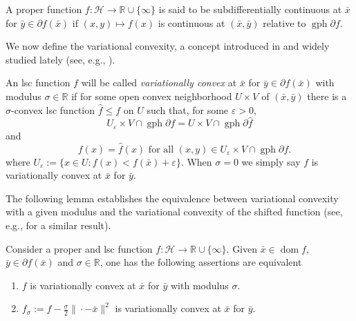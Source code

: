 \documentclass[smallextended,envcountsect,envcountsame]{svjour3}
\renewcommand{\H}{\mathcal{H}}
\newcommand{\R}{\mathbb{R}}
\newcommand{\gph}{\operatorname{gph}}
\newcommand{\dom}{\operatorname{dom}}
\renewcommand{\epsilon}{\varepsilon}
\newcommand{\1}{\mathds{1}}
\begin{document}
		\begin{definition}\label{subdif-cont}
			A proper function $f\colon \H\to\R\cup\{\infty\}$ is said to be subdifferentially continuous at $\bar x$ for $\bar y\in \partial f(\bar x)$ if $(x,y)\mapsto f(x)$ is continuous at $(\bar x,\bar y)$ relative to $\gph \partial f$.
		\end{definition}
	We now define the variational convexity, a concept introduced in \cite{MR3995335} and widely studied lately (see, e.g., \cite{MR4550949, Rockafellar2025-2, Rockafellar2025, MR4784083}).
	\begin{definition}
		An lsc function $f$ will be called \textit{variationally convex} at $\bar{x}$ for $\bar{y} \in \partial f(\bar{x})$ with modulus $\sigma\in\R$ if for some open convex neighborhood $U \times V$ of $(\bar{x}, \bar{y})$ there is a $\sigma$-convex lsc function $\hat{f} \leq f$ on $U$ such that, for some $\epsilon > 0$, 
		\begin{equation*}
			U_\varepsilon \times V \cap \operatorname{gph} \partial f = U \times V \cap \operatorname{gph} \partial \hat{f}
		\end{equation*}
		and
		\begin{equation*}
			\quad f(x) = \hat{f}(x) \text{ for all } (x,y)\in U_\varepsilon \times V \cap \operatorname{gph} \partial f.
		\end{equation*}
		where $U_\epsilon := \{x\in U : f(x)< f(\bar x)+\epsilon\}$. When $\sigma = 0$ we simply say $f$ is variationally convex at $\bar x$ for $\bar y$.
	\end{definition}
	The following lemma establishes the equivalence between variational convexity with a given modulus and the variational convexity of the shifted function (see, e.g., \cite[Theorem 5.3]{MR4784083} for a similar result).
	\begin{lemma}\label{shift-var-convex}
		Consider a proper and lsc function $ f \colon \H \to \R\cup \{\infty\} $. Given $\bar x\in \dom f$, $\bar y\in \partial f(\bar x)$ and $\sigma\in \R$, one has the following assertions are equivalent
		\begin{enumerate}
			\item [(a)] $f$ is variationally convex at $\bar x$ for $\bar y$ with modulus $\sigma$.
			\item [(b)] $f_\sigma := f-\frac{\sigma}{2}\|\cdot-\bar x\|^2$ is variationally convex at $\bar x$ for $\bar y$.
		\end{enumerate}
	\end{lemma}
\end{document}
